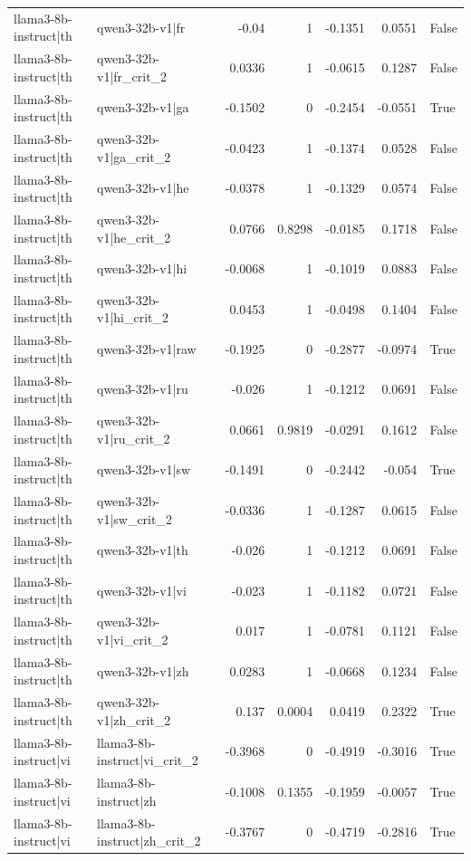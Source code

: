 \begin{table}
\begin{tabular}{l l r r r r l}
llama3-8b-instruct|th & qwen3-32b-v1|fr & -0.04 & 1 & -0.1351 & 0.0551 & False \\
llama3-8b-instruct|th & qwen3-32b-v1|fr_crit_2 & 0.0336 & 1 & -0.0615 & 0.1287 & False \\
llama3-8b-instruct|th & qwen3-32b-v1|ga & -0.1502 & 0 & -0.2454 & -0.0551 & True \\
llama3-8b-instruct|th & qwen3-32b-v1|ga_crit_2 & -0.0423 & 1 & -0.1374 & 0.0528 & False \\
llama3-8b-instruct|th & qwen3-32b-v1|he & -0.0378 & 1 & -0.1329 & 0.0574 & False \\
llama3-8b-instruct|th & qwen3-32b-v1|he_crit_2 & 0.0766 & 0.8298 & -0.0185 & 0.1718 & False \\
llama3-8b-instruct|th & qwen3-32b-v1|hi & -0.0068 & 1 & -0.1019 & 0.0883 & False \\
llama3-8b-instruct|th & qwen3-32b-v1|hi_crit_2 & 0.0453 & 1 & -0.0498 & 0.1404 & False \\
llama3-8b-instruct|th & qwen3-32b-v1|raw & -0.1925 & 0 & -0.2877 & -0.0974 & True \\
llama3-8b-instruct|th & qwen3-32b-v1|ru & -0.026 & 1 & -0.1212 & 0.0691 & False \\
llama3-8b-instruct|th & qwen3-32b-v1|ru_crit_2 & 0.0661 & 0.9819 & -0.0291 & 0.1612 & False \\
llama3-8b-instruct|th & qwen3-32b-v1|sw & -0.1491 & 0 & -0.2442 & -0.054 & True \\
llama3-8b-instruct|th & qwen3-32b-v1|sw_crit_2 & -0.0336 & 1 & -0.1287 & 0.0615 & False \\
llama3-8b-instruct|th & qwen3-32b-v1|th & -0.026 & 1 & -0.1212 & 0.0691 & False \\
llama3-8b-instruct|th & qwen3-32b-v1|vi & -0.023 & 1 & -0.1182 & 0.0721 & False \\
llama3-8b-instruct|th & qwen3-32b-v1|vi_crit_2 & 0.017 & 1 & -0.0781 & 0.1121 & False \\
llama3-8b-instruct|th & qwen3-32b-v1|zh & 0.0283 & 1 & -0.0668 & 0.1234 & False \\
llama3-8b-instruct|th & qwen3-32b-v1|zh_crit_2 & 0.137 & 0.0004 & 0.0419 & 0.2322 & True \\
llama3-8b-instruct|vi & llama3-8b-instruct|vi_crit_2 & -0.3968 & 0 & -0.4919 & -0.3016 & True \\
llama3-8b-instruct|vi & llama3-8b-instruct|zh & -0.1008 & 0.1355 & -0.1959 & -0.0057 & True \\
llama3-8b-instruct|vi & llama3-8b-instruct|zh_crit_2 & -0.3767 & 0 & -0.4719 & -0.2816 & True \\

\end{tabular}
\end{table}

